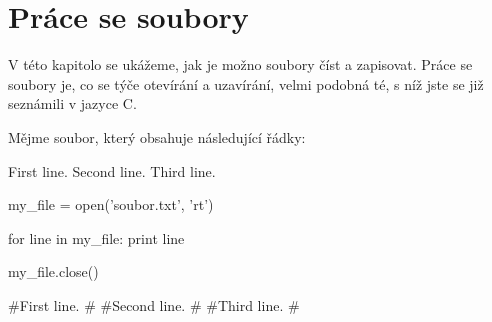 \section{Práce se soubory}

V této kapitolo se ukážeme, jak je možno soubory číst a zapisovat.
Práce se soubory je, co se týče otevírání a uzavírání, velmi podobná té,
s níž jste se již seznámili v jazyce C.

Mějme soubor, který obsahuje následující řádky:

\begin{python}
First line.
Second line.
Third line.
\end{python}

\begin{python}
my_file = open('soubor.txt', 'rt')

for line in my_file:
    print line

my_file.close()

#First line.
#
#Second line.
#
#Third line.
#
\end{python}
